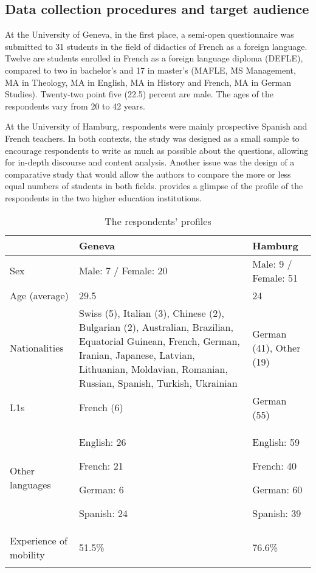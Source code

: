 \documentclass[output=paper]{../langscibook}
\begin{document}
\subsection{Data collection procedures and target audience}

At the University of Geneva, in the first place, a semi-open questionnaire was submitted to 31 students in the field of didactics of French as a foreign language. Twelve are students enrolled in French as a foreign language diploma (DEFLE), compared to two in bachelor's and 17 in master's (MAFLE, MS Management, MA in Theology, MA in English, MA in History and French, MA in German Studies). Twenty-two point five (22.5) percent are male. The ages of the respondents vary from 20 to 42 years. 

At the University of Hamburg, respondents were mainly prospective Spanish and French teachers. In both contexts, the study was designed as a small sample to encourage respondents to write as much as possible about the questions, allowing for in-depth discourse and content analysis. Another issue was the design of a comparative study that would allow the authors to compare the more or less equal numbers of students in both fields.  provides a glimpse of the profile of the respondents in the two higher education institutions.

\begin{table}
\begin{tabularx}{\textwidth}{lQQ}
\lsptoprule
& Geneva & Hamburg\\
\midrule
Sex & Male: 7 / Female: 20 & Male: 9 / Female: 51\\

\tablevspace
Age (average) & 29.5 & 24\\

\tablevspace
Nationalities & Swiss (5), Italian (3), Chinese (2), Bulgarian (2), Australian, Brazilian, Equatorial Guinean, French, German, Iranian, Japanese, Latvian, Lithuanian, Moldavian, Romanian, Russian, Spanish, Turkish,  Ukrainian & German (41),
Other (19)\\

\tablevspace
L1s & French (6) & German (55)\\

\tablevspace

Other languages & English: 26

French: 21

German: 6

Spanish: 24 & English: 59

French: 40

German: 60

Spanish: 39\\

\tablevspace

Experience of mobility & 51.5\% & 76.6\%\\
\lspbottomrule
\end{tabularx}
\caption{The respondents’ profiles}
\label{tab:9:2}
\end{table}
\end{document}
